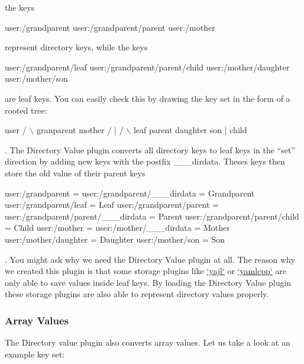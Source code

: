 the keys


\begin{DoxyCode}
user:/grandparent
user:/grandparent/parent
user:/mother
\end{DoxyCode}


represent directory keys, while the keys


\begin{DoxyCode}
user:/grandparent/leaf
user:/grandparent/parent/child
user:/mother/daughter
user:/mother/son
\end{DoxyCode}


are leaf keys. You can easily check this by drawing the key set in the form of a rooted tree\+:


\begin{DoxyCode}
             user
      /               \(\backslash\)
  granparent        mother
  /      |          /    \(\backslash\)
leaf  parent    daughter son
         |
       child
\end{DoxyCode}


. The Directory Value plugin converts all directory keys to leaf keys in the “set” direction by adding new keys with the postfix {\ttfamily \+\_\+\+\_\+\+\_\+dirdata}. Theses keys then store the old value of their parent keys


\begin{DoxyCode}
user:/grandparent                    =
user:/grandparent/\_\_\_dirdata         = Grandparent
user:/grandparent/leaf               = Leaf
user:/grandparent/parent             =
user:/grandparent/parent/\_\_\_dirdata  = Parent
user:/grandparent/parent/child       = Child
user:/mother                         =
user:/mother/\_\_\_dirdata              = Mother
user:/mother/daughter                = Daughter
user:/mother/son                     = Son
\end{DoxyCode}


. You might ask why we need the Directory Value plugin at all. The reason why we created this plugin is that some storage plugins like \hyperlink{autotoc_md786_src_plugins_yajl_README_md}{`yajl`} or \hyperlink{autotoc_md786_src_plugins_yajl_README_md}{`yamlcpp`} are only able to save values inside leaf keys. By loading the Directory Value plugin these storage plugins are also able to represent directory values properly.\hypertarget{autotoc_md173_autotoc_md175}{}\subsubsection{Array Values}\label{autotoc_md173_autotoc_md175}
The Directory value plugin also converts array values. Let us take a look at an example key set\+:


